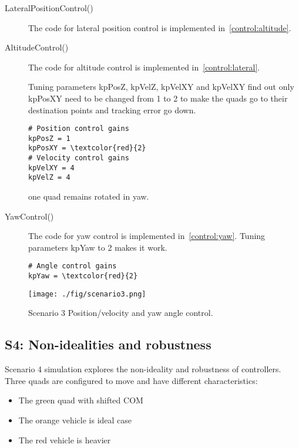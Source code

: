 \documentclass[letterpaper]{article}
\begin{document}
\begin{description}
\item [LateralPositionControl()] The code for lateral position  control is implemented in~\ref{control:altitude}. 

\item [AltitudeControl()] The code for altitude control is implemented in~\ref{control:lateral}. 

Tuning parameters kpPosZ, kpVelZ, kpVelXY and kpVelXY find out only kpPosXY need to be changed from 1 to 2 to make the quads go to their destination points and tracking error go down. 

\begin{Verbatim}[frame=single,commandchars=\\\{\}]
# Position control gains
kpPosZ = 1
kpPosXY = \textcolor{red}{2}
# Velocity control gains
kpVelXY = 4
kpVelZ = 4
\end{Verbatim} 

 one quad remains rotated in yaw. 

\item [YawControl()] The code for yaw control is implemented in~\ref{control:yaw}. Tuning parameters kpYaw to 2 makes it work.
 

\begin{Verbatim}[frame=single,commandchars=\\\{\}]
# Angle control gains
kpYaw = \textcolor{red}{2}
\end{Verbatim} 

\end{description}



\begin{figure}[ht]
\centering
\texttt{[image: ./fig/scenario3.png]}
\caption{\label{fig:scenario3} Scenario 3 Position/velocity and yaw angle control.}
\end{figure}

\subsection{S4: Non-idealities and robustness}

Scenario 4 simulation explores the non-ideality and robustness of controllers. Three quads are configured to move and have different characteristics:

\begin{itemize}
\item The green quad with shifted COM
\item The orange vehicle is ideal case
\item The red vehicle is heavier 
\end{itemize}
\end{document}
